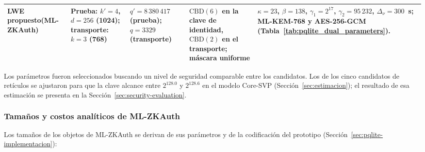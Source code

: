 \begin{table}[H]
\begin{tabularx}{\textwidth}{>{\raggedright\arraybackslash}p{2.8cm}>{\raggedright\arraybackslash}p{2.4cm}>{\raggedright\arraybackslash}p{2.3cm}>{\raggedright\arraybackslash}p{2.5cm}Y}
LWE propuesto\newline (ML-ZKAuth) &
Prueba: $k' = 4$, $d = 256$ (1024); transporte: $k = 3$ (768) &
$q' = 8\,380\,417$ (prueba); $q = 3329$ (transporte) &
$\mathrm{CBD}(6)$ en la clave de identidad, $\mathrm{CBD}(2)$ en el transporte; máscara uniforme &
$\kappa = 23$, $\beta = 138$, $\gamma_1 = 2^{17}$, $\gamma_2 = 95\,232$, $\Delta_\nu = 300$~s; ML-KEM-768 y AES-256-GCM (Tabla~\ref{tab:pqlite_dual_parameters}). \\

\bottomrule
\end{tabularx}
\end{table}

Los parámetros fueron seleccionados buscando un nivel de seguridad comparable entre
los candidatos. Los de los cinco candidatos de retículos se ajustaron para que la clave
alcance entre $2^{128.0}$ y $2^{128.6}$ en el modelo Core-SVP (Sección~\ref{sec:estimacion});
el resultado de esa estimación se presenta en la Sección~\ref{sec:security-evaluation}.

\subsubsection{Tamaños y costos analíticos de ML-ZKAuth}
\label{sec:pqlite-tamanos}

Los tamaños de los objetos de ML-ZKAuth se derivan de sus parámetros y de la
codificación del prototipo (Sección~\ref{sec:pqlite-implementacion}):

